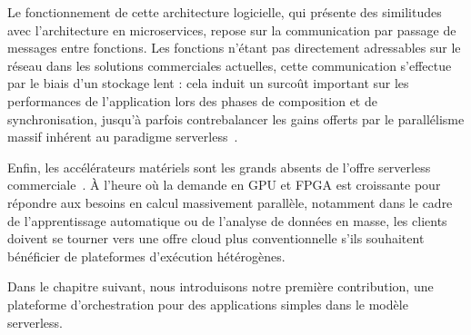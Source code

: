 
Le fonctionnement de cette architecture logicielle, qui présente des similitudes avec l'architecture en microservices, repose sur la communication par passage de messages entre fonctions. Les fonctions n'étant pas directement adressables sur le réseau dans les solutions commerciales actuelles, cette communication s'effectue par le biais d'un stockage lent : cela induit un surcoût important sur les performances de l'application lors des phases de composition et de synchronisation, jusqu'à parfois contrebalancer les gains offerts par le parallélisme massif inhérent au paradigme serverless~\cite{mullerLambadaInteractiveData2020}.


Enfin, les accélérateurs matériels sont les grands absents de l'offre serverless commerciale~\cite{khandelwalTaureauDeconstructingServerless2020}. À l'heure où la demande en \gls{GPU} et \gls{FPGA} est croissante pour répondre aux besoins en calcul massivement parallèle, notamment dans le cadre de l'apprentissage automatique ou de l'analyse de données en masse, les clients doivent se tourner vers une offre cloud plus conventionnelle s'ils souhaitent bénéficier de plateformes d'exécution hétérogènes.

Dans le chapitre suivant, nous introduisons notre première contribution, une plateforme d'orchestration pour des applications simples dans le modèle serverless.
